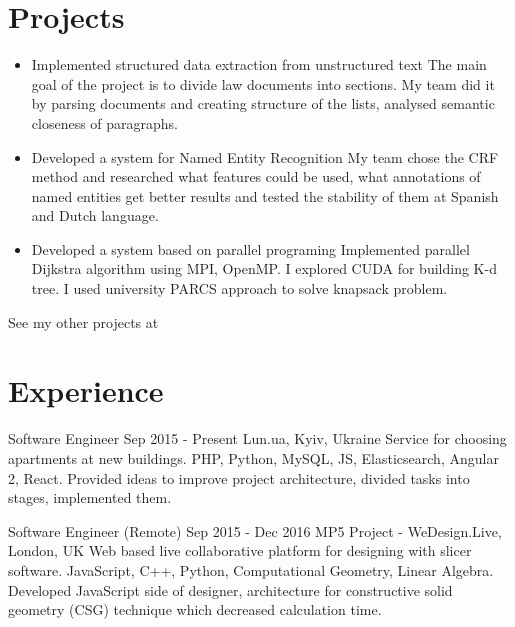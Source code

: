 \documentclass[letterpaper]{twentysecondcv} %
\begin{document}
\section{Projects}
\begin{itemize}
    \item \projectItem
        {Implemented structured data extraction from unstructured text }
        {The main goal of the project is to divide law documents into sections. My team did it by parsing documents and creating structure of the lists, analysed semantic closeness of paragraphs.}
	\item \projectItem
        {Developed a system for Named Entity Recognition}
        {My team chose the CRF method and researched what features could be used, what annotations of named entities get better results and tested the stability of them at Spanish and Dutch language.}
    \item \projectItem
        {Developed a system based on parallel programing}
        {Implemented parallel Dijkstra algorithm using MPI, OpenMP. I explored CUDA for building K-d tree. I used university PARCS approach to solve knapsack problem.}
\end{itemize}
\projectItem
    {See my other projects at  }
    {}


\section{Experience}

\begin{twenty} %
	\twentyitemwithoutbegin
    	{}
        {Software Engineer}
        {Sep 2015 - Present}
        {Lun.ua, Kyiv, Ukraine}
        {Service for choosing apartments at new buildings.
        {PHP, Python, MySQL, JS, Elasticsearch, Angular 2, React. Provided ideas to improve project architecture, divided tasks into stages, implemented them.
        }
    }

    \twentyitemwithoutbegin
   	    {}
        {Software Engineer (Remote)}
        {Sep 2015 - Dec 2016 }
        {MP5 Project - WeDesign.Live, London, UK}
        {Web based live collaborative platform for designing with slicer software.
        {JavaScript, C++, Python, Computational Geometry, Linear Algebra. Developed JavaScript side of designer, architecture for constructive solid geometry (CSG) technique which decreased calculation time.
        }
        }
\end{twenty}
\end{document}
